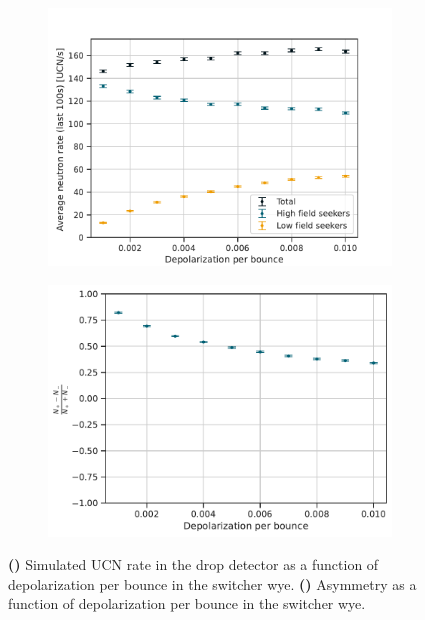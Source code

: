 \begin{figure}
\centering
\begin{subfigure}{.5\textwidth} 
  \centering
  \includegraphics[width=\textwidth]{figures/flow_through_average.pdf}
  \vspace{0pt}
  \caption{}\label{subfig:pentrack_north_beamline_flow_through_average}
\end{subfigure}%
\begin{subfigure}{.5\textwidth}
  \centering
  \includegraphics[width=\textwidth]{figures/flow_through_spin_contrast.pdf}
  \vspace{-7pt}
  \caption{}\label{subfig:pentrack_north_beamline_flow_through_asymmetry}
\end{subfigure}
\caption
    {\textbf{()} Simulated UCN rate in the drop detector as a function of depolarization per bounce in the switcher wye. \textbf{()} Asymmetry as a function of depolarization per bounce in the switcher wye.}
\label{fig:pentrack_north_beamline_flow_through}
\end{figure}

